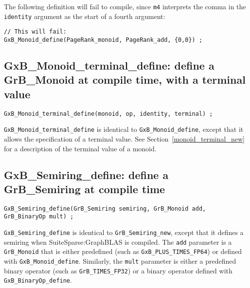 \documentclass[12pt]{article}
\begin{document}
\noindent
The following definition will fail to compile, since \verb'm4' interprets the
comma in the \verb'identity' argument as the start of a fourth argument:

{\footnotesize
\begin{verbatim}
// This will fail:
GxB_Monoid_define(PageRank_monoid, PageRank_add, {0,0}) ;
\end{verbatim} }

\subsection{{\sf GxB\_Monoid\_terminal\_define:}
define a {\sf GrB\_Monoid} at compile time, with a terminal value}
\label{monoid_terminal_define}

\begin{mdframed}[userdefinedwidth=6in]
{\footnotesize
\begin{verbatim}
GxB_Monoid_terminal_define(monoid, op, identity, terminal) ;
\end{verbatim} } \end{mdframed}

\verb'GxB_Monoid_terminal_define' is identical to \verb'GxB_Monoid_define',
except that it allows the specification of a terminal value.  See
Section~\ref{monoid_terminal_new} for a description of the terminal value of
a monoid.

\subsection{{\sf GxB\_Semiring\_define:}
define a {\sf GrB\_Semiring} at compile time}
\label{semiring_define}

\begin{mdframed}[userdefinedwidth=6in]
{\footnotesize
\begin{verbatim}
GxB_Semiring_define(GrB_Semiring semiring, GrB_Monoid add, GrB_BinaryOp mult) ;
\end{verbatim} } \end{mdframed}

    \verb'GxB_Semiring_define' is identical to \verb'GrB_Semiring_new', except
    that it defines a semiring when SuiteSparse:GraphBLAS is compiled.  The
    \verb'add' parameter is a \verb'GrB_Monoid' that is either predefined (such
    as \verb'GxB_PLUS_TIMES_FP64') or defined with \verb'GxB_Monoid_define'.
    Similarly, the \verb'mult' parameter is either a predefined binary operator
    (such as \verb'GrB_TIMES_FP32') or a binary operator defined with
    \verb'GxB_BinaryOp_define'.
\end{document}
